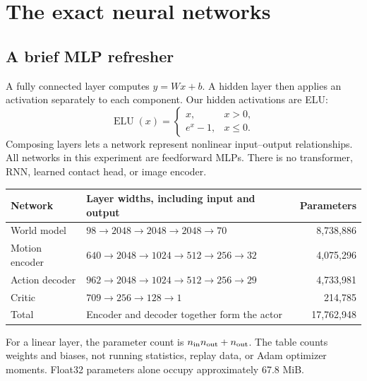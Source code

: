 \documentclass[11pt,a4paper]{article}
\begin{document}
\section{The exact neural networks}\label{sec:networks}
\subsection{A brief MLP refresher}
A fully connected layer computes $y=Wx+b$. A hidden layer then applies an
activation separately to each component. Our hidden activations are ELU:
\begin{equation}
\operatorname{ELU}(x)=\begin{cases}x,&x>0,\\e^x-1,&x\leq0.\end{cases}
\end{equation}
Composing layers lets a network represent nonlinear input--output relationships.
All networks in this experiment are feedforward MLPs. There is no transformer,
RNN, learned contact head, or image encoder.

\begin{center}
\small
\begin{tabularx}{\linewidth}{@{}lXr@{}}
\toprule
Network & Layer widths, including input and output & Parameters\\
\midrule
World model & $98\to2048\to2048\to2048\to70$ & 8,738,886\\
Motion encoder & $640\to2048\to1024\to512\to256\to32$ & 4,075,296\\
Action decoder & $962\to2048\to1024\to512\to256\to29$ & 4,733,981\\
Critic & $709\to256\to128\to1$ & 214,785\\
\midrule
Total & Encoder and decoder together form the actor & 17,762,948\\
\bottomrule
\end{tabularx}
\end{center}
For a linear layer, the parameter count is $n_{\rm in}n_{\rm out}+n_{\rm out}$.
The table counts weights and biases, not running statistics, replay data, or Adam
optimizer moments. Float32 parameters alone occupy approximately 67.8 MiB.
\end{document}
